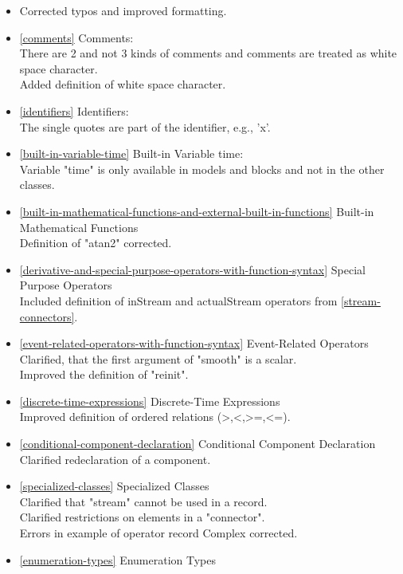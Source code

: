 \documentclass[10pt,a4paper]{report}
\begin{document}
\begin{itemize}
\item
  Corrected typos and improved formatting.
\item
  \ref{comments} Comments:\\
  There are 2 and not 3 kinds of comments and comments are treated as
  white space character.\\
  Added definition of white space character.
\item
  \ref{identifiers} Identifiers:\\
  The single quotes are part of the identifier, e.g., 'x'.
\item
  \ref{built-in-variable-time} Built-in Variable time:\\
  Variable "time" is only available in models and blocks and not in the
  other classes.
\item
  \ref{built-in-mathematical-functions-and-external-built-in-functions} Built-in Mathematical Functions\\
  Definition of "atan2" corrected.
\item
  \ref{derivative-and-special-purpose-operators-with-function-syntax} Special Purpose Operators\\
  Included definition of inStream and actualStream operators from
  \ref{stream-connectors}.
\item
  \ref{event-related-operators-with-function-syntax} Event-Related Operators\\
  Clarified, that the first argument of "smooth" is a scalar.\\
  Improved the definition of "reinit".
\item
  \ref{discrete-time-expressions} Discrete-Time Expressions\\
  Improved definition of ordered relations
  (\textgreater{},\textless{},\textgreater{}=,\textless{}=).
\item
  \ref{conditional-component-declaration} Conditional Component Declaration\\
  Clarified redeclaration of a component.
\item
  \ref{specialized-classes} Specialized Classes\\
  Clarified that "stream" cannot be used in a record.\\
  Clarified restrictions on elements in a "connector".\\
  Errors in example of operator record Complex corrected.
\item
  \ref{enumeration-types} Enumeration Types\\

\end{itemize}
\end{document}

